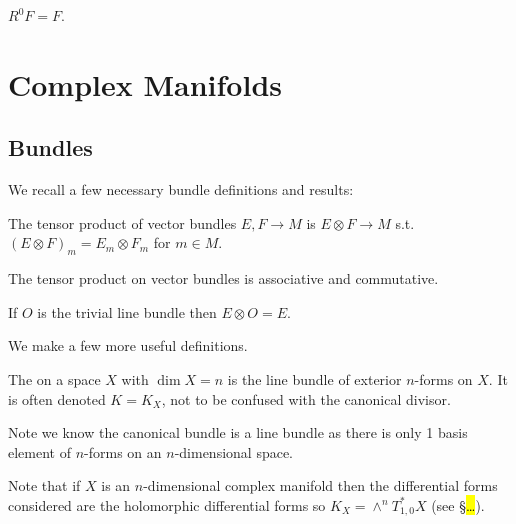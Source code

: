 \documentclass{article}
\begin{document}
\begin{lemma}
	$R^0F = F$. 
\end{lemma}



\section{Complex Manifolds}
\subsection{Bundles}
We recall a few necessary bundle definitions and results:
\begin{definition}
	The tensor product of vector bundles $E,F \to M$ is $E\otimes F \to M$ s.t. $(E \otimes F)_m = E_m \otimes F_m$ for $m \in M$. 
\end{definition}

\begin{lemma}
	The tensor product on vector bundles is associative and commutative. 
\end{lemma}

\begin{lemma}
	If $O$ is the trivial line bundle then $E\otimes O = E$. 
\end{lemma}


We make a few more useful definitions. 



\begin{definition}
	The  on a space $X$ with $\dim X = n$ is the line bundle of exterior $n$-forms on $X$. It is often denoted $K=K_X$, not to be confused with the canonical divisor.
\end{definition}
\begin{remark}
	Note we know the canonical bundle is a line bundle as there is only 1 basis element of $n$-forms on an $n$-dimensional space. 
\end{remark}
\begin{remark}
	Note that if $X$ is an $n$-dimensional complex manifold then the differential forms considered are the holomorphic differential forms so $K_X = \wedge^n T^\ast_{1,0}X$ (see \S \hl{\dots}). 
\end{remark}
\end{document}
